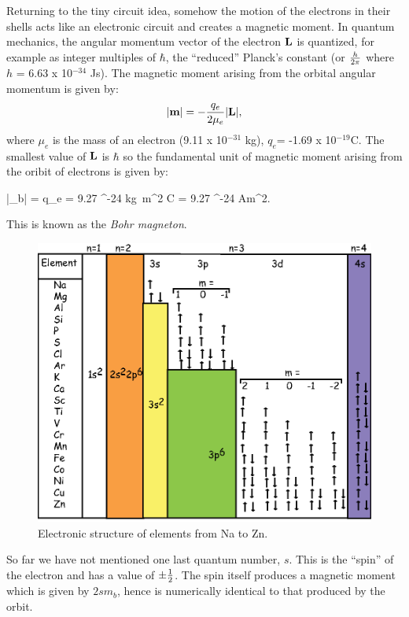 {Returning to the tiny circuit idea,  somehow the motion of the electrons in their shells acts like an electronic circuit and creates a 
magnetic moment.  
In quantum mechanics,  the angular momentum vector of the electron ${\bf L}$  is quantized, for example as integer multiples of $\hbar$, the 
``reduced'' 
Planck's constant (or ${h\over{2\pi}}$ where $h$ = 6.63 x 10$^{-34}$ Js).   The magnetic moment arising from the orbital angular momentum is given by:
$$
|\hbox{\bf m}| = -{ {q_e}\over {2\mu_e}}|{\bf L}|,
$$
\noindent
where $\mu_e$ is the mass of an electron (9.11 x 10$^{-31}$ kg), $q_e$= -1.69 x 10$^{-19}$C.   The smallest value of ${\bf L}$ is $\hbar$ so 
 the fundamental
unit of magnetic moment arising from the oribit of  electrons is given by:

\beq
|\m_b| = { \hbar 
{q_e}
} = 9.27 ^{-24} 
{{\hbox{kg  m}^2}}
 \cdot
 {\hbox{C}}
 = 9.27 ^{-24} {\hbox{Am}^2}.
\label{eq:bohrmagneton}
\eeq

\noindent This is known as  the 
{\it Bohr magneton}.   

\begin{figure}[h!tb]
\centering  \includegraphics[width=9 cm]{EPSfiles/structure.eps}
\caption{Electronic structure of elements from Na to Zn. }
\label{fig:structure}
\end{figure}


So far we have not mentioned one last quantum number, $s$.  This is the 
``spin'' of the electron and has a value of $\pm {1\over 2}$.   The spin itself produces a magnetic moment which is given by $2sm_b$, hence is numerically identical to that produced by the orbit.   

}
